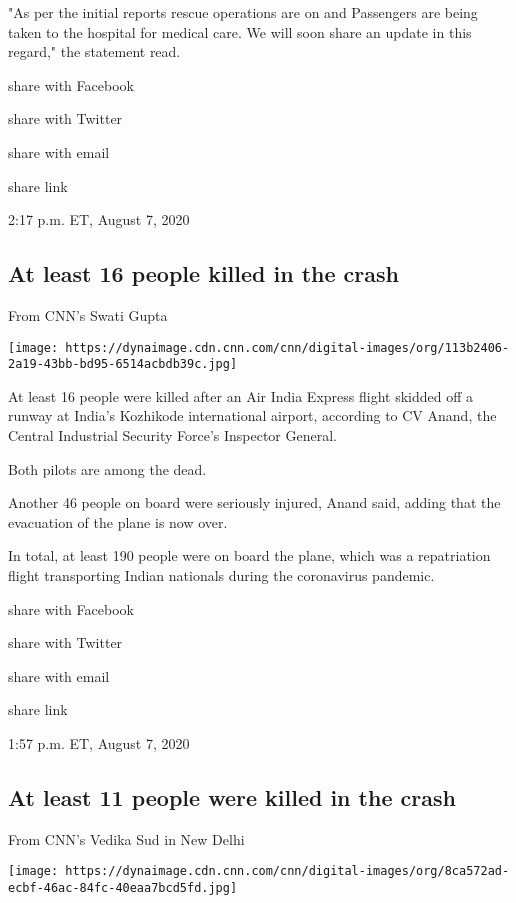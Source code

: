 "As per the initial reports rescue operations are on and Passengers are
being taken to the hospital for medical care. We will soon share an
update in this regard," the statement read.

share with Facebook

share with Twitter

share with email

share link

2:17 p.m. ET, August 7, 2020

\hypertarget{at-least-16-people-killed-in-the-crash}{%
\subsection{At least 16 people killed in the
crash}\label{at-least-16-people-killed-in-the-crash}}

From CNN's Swati Gupta

\texttt{[image: https://dynaimage.cdn.cnn.com/cnn/digital-images/org/113b2406-2a19-43bb-bd95-6514acbdb39c.jpg]}

At least 16 people were killed after an Air India Express flight skidded
off a runway at India's Kozhikode international airport, according to CV
Anand, the Central Industrial Security Force's Inspector General.

Both pilots are among the dead.

Another 46 people on board were seriously injured, Anand said, adding
that the evacuation of the plane is now over.

In total, at least 190 people were on board the plane, which was a
repatriation flight transporting Indian nationals during the coronavirus
pandemic.

share with Facebook

share with Twitter

share with email

share link

1:57 p.m. ET, August 7, 2020

\hypertarget{at-least-11-people-were-killed-in-the-crash}{%
\subsection{At least 11 people were killed in the
crash}\label{at-least-11-people-were-killed-in-the-crash}}

From CNN's Vedika Sud in New Delhi

\texttt{[image: https://dynaimage.cdn.cnn.com/cnn/digital-images/org/8ca572ad-ecbf-46ac-84fc-40eaa7bcd5fd.jpg]}

